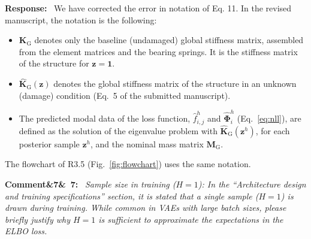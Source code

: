 \documentclass[11pt]{article}
\newenvironment{rcomment}[1]{\par\bigskip\noindent\textbf{Comment\ifx&#1&\else\ #1\fi:}\ \itshape}{\par}
\newenvironment{response}{\par\smallskip\noindent\color{resp}\textbf{Response:}\ }{\par}
\newenvironment{action}{\par\smallskip\noindent\color{resp}\textbf{Action:}\ }{\par}
\newcommand{\tbd}[1]{\textcolor{note}{\textsf{[#1]}}}
\newcommand{\lines}[1]{\tbd{lines #1}}
\newcommand{\z}{\mathbf{z}}
\begin{document}
\begin{response}
We have corrected the error in notation of Eq. 11. 
In the revised manuscript, the notation is the following:
\begin{itemize}[leftmargin=*]
	\item $\mathbf{K}_{\text{G}}$ denotes only the baseline (undamaged) global stiffness matrix, assembled from the element matrices and the bearing springs. It is the stiffness matrix of the structure for $\z=\mathbf{1}$.
	\item $\hat{\mathbf{K}}_{\text{G}}(\z)$ denotes the global stiffness matrix of the structure in an unknown (damage) condition (Eq.~5 of the submitted manuscript).
	\item The predicted modal data of the loss function, $\hat f^{h}_{i,j}$ and $\hat{\bm\Phi}^{h}_{i}$ (Eq.~\eqref{eq:nll}), are defined as the solution of the eigenvalue problem with $\hat{\mathbf{K}}_{\text{G}}(\z^{h})$, for each posterior sample $\z^{h}$, and the nominal mass matrix $\mathbf{M}_{\text{G}}$.
\end{itemize}
The flowchart of R3.5 (Fig.~\ref{fig:flowchart}) uses the same notation.
\end{response}

\begin{rcomment}{7}
Sample size in training ($H=1$): In the ``Architecture design and training specifications'' section, it is stated that
a single sample ($H=1$) is drawn during training. While common in VAEs with large batch sizes, please briefly justify why
$H=1$ is sufficient to approximate the expectations in the ELBO loss.
\end{rcomment}
\end{document}
